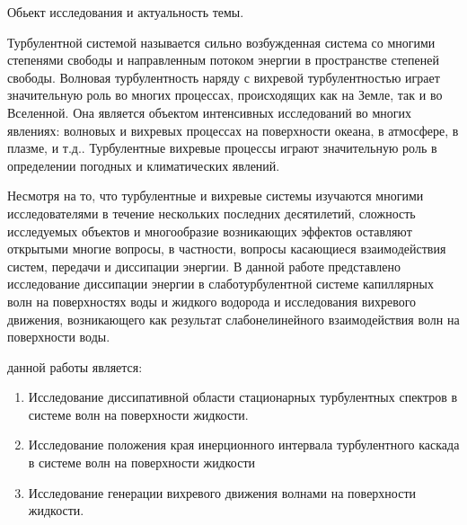 
{\actuality}Обьект исследования и актуальность темы.

Турбулентной системой называется сильно возбужденная система со многими степенями свободы и направленным потоком энергии в пространстве степеней свободы. Волновая турбулентность наряду с вихревой турбулентностью играет значительную роль во многих процессах, происходящих как на Земле, так и во Вселенной. Она является объектом  интенсивных исследований во многих явлениях: волновых и вихревых процессах на поверхности океана, в атмосфере, в плазме, и т.д.. Турбулентные вихревые процессы играют значительную роль в определении погодных и климатических явлений. 

Несмотря на то, что турбулентные и вихревые системы изучаются многими исследователями в течение нескольких последних десятилетий, сложность исследуемых объектов и многообразие возникающих эффектов оставляют открытыми многие вопросы, в частности, вопросы касающиеся взаимодействия систем, передачи и диссипации энергии. 
В данной работе представлено исследование диссипации энергии в слаботурбулентной системе капиллярных волн на поверхностях воды и жидкого водорода и исследования вихревого движения, возникающего как результат слабонелинейного взаимодействия волн на поверхности воды.

{\aim} данной работы является: 
\begin{enumerate}
	\item Исследование диссипативной области стационарных турбулентных спектров в системе волн на поверхности жидкости.
	\item Исследование положения края инерционного интервала турбулентного каскада в системе волн на поверхности жидкости
	\item Исследование генерации вихревого движения волнами на поверхности жидкости.
\end{enumerate}


